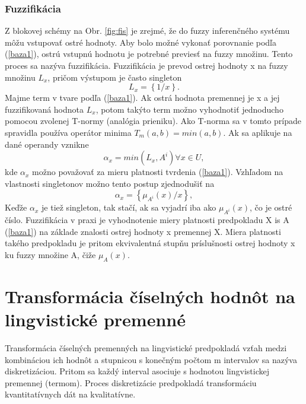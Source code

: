 \subsubsection{Fuzzifikácia}
Z blokovej schémy na Obr. \ref{fig:fis} je zrejmé, že do fuzzy inferenčného systému môžu vstupovať ostré hodnoty. Aby bolo možné vykonať porovnanie podľa (\ref{baza1}), ostrú vstupnú hodnotu je potrebné previesť na fuzzy množinu. Tento proces sa nazýva fuzzifikácia. Fuzzifikácia je prevod ostrej hodnoty x na fuzzy množinu $L_x$, pričom výstupom je často singleton \cite{gregorUI}
\begin{equation}\label{fuzzysingle1}
L_x = \left\lbrace1/x\right\rbrace .  
\end{equation}
Majme term v tvare podľa (\ref{baza1}). Ak ostrá hodnota premennej je x a jej fuzzifikovaná hodnota  $L_x$, potom takýto term možno vyhodnotiť jednoducho pomocou zvolenej T-normy (analógia prieniku). Ako T-norma sa v tomto prípade spravidla používa operátor minima  $T_m(a, b)=min(a, b)$. Ak sa aplikuje na dané operandy vznikne \cite{gregorUI}
\begin{equation}\label{fuzzimin}
\alpha_x = min(L_x, A^{i}) \forall x \in U, 
\end{equation}
kde $\alpha_x$ možno považovať za mieru platnosti tvrdenia (\ref{baza1}). 
Vzhľadom na vlastnosti singletonov možno tento postup zjednodušiť na 
\begin{equation}\label{fuzziminsingle}
\alpha_x = \left\lbrace \mu_{A^i}(x)/x\right\rbrace , 
\end{equation}
Keďže $\alpha_x$ je tiež singleton, tak stačí, ak sa vyjadrí iba ako $\mu_{A^i}(x)$, čo je ostré číslo. 
Fuzzifikácia v praxi je vyhodnotenie miery platnosti predpokladu X is A (\ref{baza1}) na základe znalosti ostrej hodnoty x premennej X. Miera platnosti takého predpokladu je pritom ekvivalentná stupňu príslušnosti ostrej hodnoty x ku fuzzy množine A, čiže  $\mu_{A}(x)$. \cite{gregorUI}  

\pagebreak








\pagebreak
\section{Transformácia číselných hodnôt na lingvistické premenné}
Transformácia číselných premenných na lingvistické predpokladá vzťah medzi kombináciou ich hodnôt a stupnicou s konečným počtom m intervalov sa nazýva diskretizáciou. 
Pritom sa každý interval asociuje s hodnotou lingvistickej premennej (termom). Proces diskretizácie predpokladá transformáciu kvantitatívnych dát na kvalitatívne. \cite{levashenkoProj, Catlett1991}


